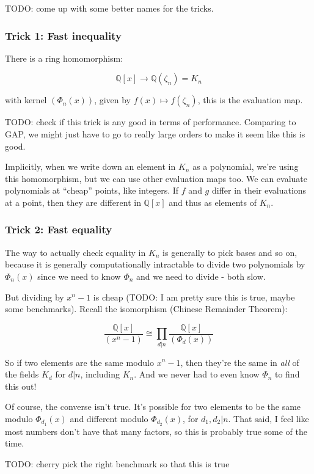 \documentclass{article}
\begin{document}
TODO: come up with some better names for the tricks.

\subsubsection{Trick 1: Fast inequality}

There is a ring homomorphism:

$$\mathbb{Q}[x] \to \mathbb{Q}(\zeta_n) = K_n$$

with kernel $(\Phi_n(x))$, given by $f(x) \mapsto f(\zeta_n)$, this is
the evaluation map.

TODO: check if this trick is any good in terms of
performance. Comparing to GAP, we might just have to go to really
large orders to make it seem like this is good.

Implicitly, when we write down an element in $K_n$ as a polynomial,
we're using this homomorphism, but we can use other evaluation maps
too. We can evaluate polynomials at ``cheap'' points, like
integers. If $f$ and $g$ differ in their evaluations at a point, then
they are different in $\mathbb{Q}[x]$ and thus as elements of $K_n$.

\subsubsection{Trick 2: Fast equality}

The way to actually check equality in $K_n$ is generally to pick bases
and so on, because it is generally computationally intractable to
divide two polynomials by $\Phi_n(x)$ since we need to know $\Phi_n$
and we need to divide - both slow.

But dividing by $x^n - 1$ is cheap (TODO: I am pretty sure this is
true, maybe some benchmarks). Recall the isomorphism (Chinese
Remainder Theorem):

$$\frac{\mathbb{Q}[x]}{(x^n-1)} \cong \prod_{d | n}\frac{\mathbb{Q}[x]}{(\Phi_d(x))}$$

So if two elements are the same modulo $x^n-1$, then they're the same
in \emph{all} of the fields $K_d$ for $d | n$, including $K_n$. And we
never had to even know $\Phi_n$ to find this out!

Of course, the converse isn't true. It's possible for two elements to
be the same modulo $\Phi_{d_1}(x)$ and different modulo
$\Phi_{d_2}(x)$, for $d_1, d_2 | n$. That said, I feel like most
numbers don't have that many factors, so this is probably true some of
the time.

TODO: cherry pick the right benchmark so that this is true
\end{document}
